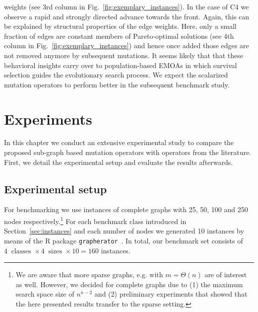 \documentclass[twoside]{article}
\begin{document}
weights (see 3rd column in Fig.~\ref{fig:exemplary_instances}). In the case of C4 we observe a rapid and strongly directed advance towards the front. Again, this can be explained by structural properties of the edge weights. Here, only a small fraction of edges are constant members of Pareto-optimal solutions (see 4th column in Fig.~\ref{fig:exemplary_instances}) and hence once added those edges are not removed anymore by subsequent mutations.
It seems likely that that these behavioral insights carry over to population-based EMOAs in which survival selection guides the evolutionary search process. We expect the scalarized mutation operators to perform better in the subsequent benchmark study.




\section{Experiments}
\label{sec:experiments}

In this chapter we conduct an extensive experimental study to compare the proposed sub-graph based mutation operators with operators from the literature. First, we detail the experimental setup and evaluate the results afterwards.

\subsection{Experimental setup}

For benchmarking we use instances of complete graphs with 25, 50, 100 and 250 nodes respectively.\footnote{We are aware that more sparse graphs, e.g. with $m=\Theta(n)$ are of interest as well. However, we decided for complete graphs due to (1) the maximum search space size of $n^{n-2}$ and (2) preliminary experiments that showed that the here presented results transfer to the sparse setting.} For each benchmark class introduced in Section~\ref{sec:instances} and each number of nodes we generated 10 instances by means of the R package \texttt{grapherator}~\citep{B2018grapherator}. In total, our benchmark set consists of $4~\text{ classes } \times 4~\text{ sizes } \times 10 = 160$ instances.
\end{document}
